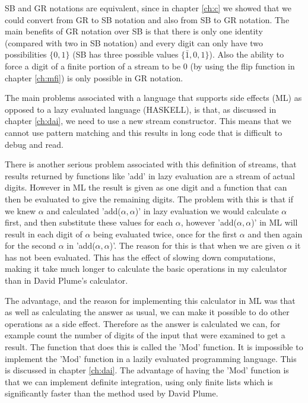 \documentclass{cs4rep}
\begin{document}
SB and GR notations are equivalent, since in chapter \ref{ch:c} we
showed that we could convert from GR to SB notation and also from SB
to GR notation. The main benefits of GR notation over SB is that there
is only one identity (compared with two in SB notation) and every
digit can only have two possibilities $\{0,1\}$ (SB has three possible
values $\{\bar{1},0,1\}$). Also the ability to force a digit of a
finite portion of a stream to be 0 (by using the flip function in
chapter \ref{ch:mfi}) is only possible in GR notation.

The main problems associated with a language that supports side
effects (ML) as opposed to a lazy evaluated language (HASKELL), is
that, as discussed in chapter \ref{ch:dai}, we need to use a new
stream constructor. This means that we cannot use pattern matching and
this results in long code that is difficult to debug and read.

There is another serious problem associated with this definition of
streams, that results returned by functions like 'add' in lazy
evaluation are a stream of actual digits. However in ML the result is
given as one digit and a function that can then be evaluated to give
the remaining digits. The problem with this is that if we knew
$\alpha$ and calculated 'add($\alpha,\alpha$)' in lazy evaluation we
would calculate $\alpha$ first, and then substitute these values for
each $\alpha$, however 'add($\alpha,\alpha$)' in ML will result in
each digit of $\alpha$ being evaluated twice, once for the first
$\alpha$ and then again for the second $\alpha$ in
'add($\alpha,\alpha$)'. The reason for this is that when we are given
$\alpha$ it has not been evaluated.  This has the effect of slowing
down computations, making it take much longer to calculate the basic
operations in my calculator than in David Plume's calculator.

The advantage, and the reason for implementing this calculator in ML
was that as well as calculating the answer as usual, we can make it
possible to do other operations as a side effect. Therefore as
the answer is calculated we can, for example count the number of
digits of the input that were examined to get a result. The function
that does this is called the 'Mod' function.  It is impossible to
implement the 'Mod' function in a lazily evaluated programming
language. This is discussed in chapter \ref{ch:dai}.  The advantage of
having the 'Mod' function is that we can implement definite
integration, using only finite lists which is significantly faster
than the method used by David Plume.
\end{document}
